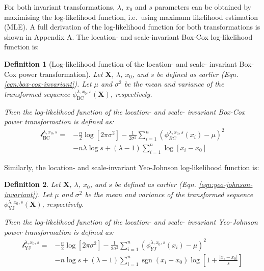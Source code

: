 \documentclass[
  a4paper,
]{article}
\newtheorem*{definition}{Definition}
\begin{document}
For both invariant transformations, \(\lambda\), \(x_0\) and \(s\)
parameters can be obtained by maximising the log-likelihood function,
i.e.~using maximum likelihood estimation (MLE). A full derivation of the
log-likelihood function for both transformations is shown in Appendix A.
The location- and scale-invariant Box-Cox log-likelihood function is:

\begin{definition} [Log-likelihood function of the location- and scale- invariant Box-Cox power transformation]
Let $\mathbf{X}$, $\lambda$, $x_0$, and $s$ be defined as earlier (Eqn. \ref{eqn:box-cox-invariant}).
Let $\mu$ and $\sigma^2$ be the mean and variance of the transformed sequence $\phi_{\text{BC}}^{\lambda, x_0, s} (\mathbf{X})$, respectively.

Then the log-likelihood function of the location- and scale- invariant Box-Cox power transformation is defined as:
\begin{equation}
\label{eqn:box-cox-invariant-log-likelihood}
\begin{split}
\mathcal{l}_{\text{BC}}^{\lambda, x_0, s} = & -\frac{n}{2} \log \left[2 \pi \sigma^2 \right] -\frac{1}{2 \sigma^2} \sum_{i=1}^n \left( \phi_{BC}^{\lambda, x_0, s}(x_i) - \mu \right)^2 \\
& -n \lambda \log s + \left( \lambda - 1 \right) \sum_{i=1}^n \log \left[ x_i - x_0 \right]
\end{split}
\end{equation}
\end{definition}

Similarly, the location- and scale-invariant Yeo-Johnson log-likelihood
function is:

\begin{definition}
Let $\mathbf{X}$, $\lambda$, $x_0$, and $s$ be defined as earlier (Eqn. \ref{eqn:yeo-johnson-invariant}).
Let $\mu$ and $\sigma^2$ be the mean and variance of the transformed sequence $\phi_{\text{YJ}}^{\lambda, x_0, s} (\mathbf{X})$, respectively.

Then the log-likelihood function of the location- and scale- invariant Yeo-Johnson power transformation is defined as:
\begin{equation}
\label{eqn:yeo-johnson-invariant-log-likelihood}
\begin{split}
\mathcal{l}_{\text{YJ}}^{\lambda, x_0, s} = & -\frac{n}{2} \log\left[2 \pi \sigma^2\right] -\frac{1}{2 \sigma^2} \sum_{i=1}^n \left( \phi_{YJ}^{\lambda, x_0, s}(x_i) - \mu \right)^2 \\
& - n \log s + (\lambda - 1) \sum_{i=1}^n \mathop{\mathrm{sgn}}(x_i - x_0) \log \left[1 + \frac{|x_i - x_0|}{s} \right]
\end{split}
\end{equation}
\end{definition}
\end{document}
